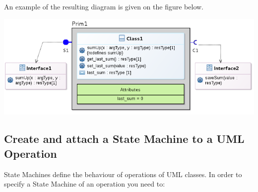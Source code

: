 \documentclass[12pt]{article}
\begin{document}
An example of the resulting diagram is given on the figure below.

     \centerline{
     \includegraphics[width=14cm]{draws/prim-attr.png}
     \label{fig:vce-proj}
     }
     
\subsection{Create and attach a State Machine to a UML Operation}

State Machines define the behaviour of operations of UML classes. In order to specify a State Machine of an operation you need to:
\end{document}
